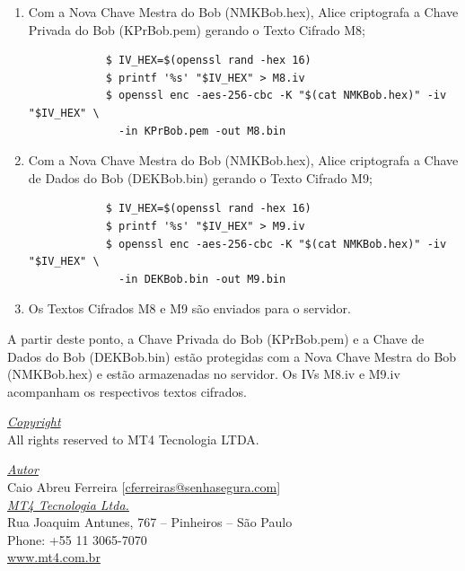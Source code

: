 \begin{enumerate}
\begin{tcolorbox}[width=\textwidth]
{\begin{verbatim}
			$ openssl pkeyutl -decrypt -inkey KPrAlice.pem -in M6.bin -out DEKBob.bin \
			  -pkeyopt rsa_padding_mode:oaep -pkeyopt rsa_oaep_md:sha256
			\end{verbatim}
		}
	\end{tcolorbox}
	\item Com a Nova Chave Mestra do Bob (NMKBob.hex), Alice criptografa a Chave Privada do Bob (KPrBob.pem) gerando o Texto Cifrado M8;
	\begin{tcolorbox}[width=\textwidth]
		{\scriptsize
			\begin{verbatim}
			$ IV_HEX=$(openssl rand -hex 16)
			$ printf '%s' "$IV_HEX" > M8.iv
			$ openssl enc -aes-256-cbc -K "$(cat NMKBob.hex)" -iv "$IV_HEX" \
			  -in KPrBob.pem -out M8.bin
			\end{verbatim}
		}
	\end{tcolorbox}
	\item Com a Nova Chave Mestra do Bob (NMKBob.hex), Alice criptografa a Chave de Dados do Bob (DEKBob.bin) gerando o Texto Cifrado M9;
	\begin{tcolorbox}[width=\textwidth]
		{\scriptsize
			\begin{verbatim}
			$ IV_HEX=$(openssl rand -hex 16)
			$ printf '%s' "$IV_HEX" > M9.iv
			$ openssl enc -aes-256-cbc -K "$(cat NMKBob.hex)" -iv "$IV_HEX" \
			  -in DEKBob.bin -out M9.bin
			\end{verbatim}
		}
	\end{tcolorbox}
	\item Os Textos Cifrados M8 e M9 são enviados para o servidor.
\end{enumerate}

A partir deste ponto, a Chave Privada do Bob (KPrBob.pem) e a Chave de Dados do Bob (DEKBob.bin) estão protegidas com a Nova Chave Mestra do Bob (NMKBob.hex) e estão armazenadas no servidor. Os IVs M8.iv e M9.iv acompanham os respectivos textos cifrados.

\pagebreak

\vspace*{\fill}
\begin{flushright}
	\underline{\textit{Copyright}}\\
	All rights reserved to MT4 Tecnologia LTDA.\bigskip

	\underline{\textit{Autor}}\\
	Caio Abreu Ferreira [\href{mailto:cferreira@senhasegura.com}{cferreiras@senhasegura.com}] \bigskip\\
	
	\underline{\textit{MT4 Tecnologia Ltda.}}\\
	Rua Joaquim Antunes, 767 – Pinheiros – São Paulo\\
	Phone: +55 11 3065-7070\\
	\url{www.mt4.com.br}\\
\end{flushright}
